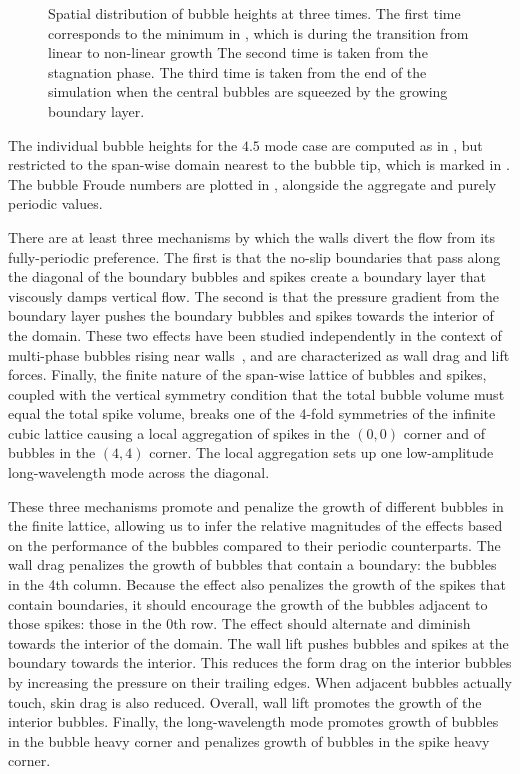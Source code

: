 \begin{figure}
\begin{subfigure}[b]{0.66\columnwidth}
\end{subfigure}
\caption{ 
Spatial distribution of bubble heights at three times.
The first time corresponds to the minimum in , which is during the transition from linear to non-linear growth
The second time is taken from the stagnation phase.
The third time is taken from the end of the simulation when the central bubbles are squeezed by the growing boundary layer.
}
\end{figure}

The individual bubble heights for the $4.5$ mode case are computed as in , but restricted to the span-wise domain nearest to the bubble tip, which is marked in .
The bubble Froude numbers are plotted in , alongside the aggregate and purely periodic values.

There are at least three mechanisms by which the walls divert the flow from its fully-periodic preference.
The first is that the no-slip boundaries that pass along the diagonal of the boundary bubbles and spikes create a boundary layer that viscously damps vertical flow.
The second is that the pressure gradient from the boundary layer pushes the boundary bubbles and spikes towards the interior of the domain.
These two effects have been studied independently in the context of multi-phase bubbles rising near walls~\cite{Takemura2002}, and are characterized as wall drag and lift forces.
Finally, the finite nature of the span-wise lattice of bubbles and spikes, coupled with the vertical symmetry condition that the total bubble volume must equal the total spike volume, breaks one of the 4-fold symmetries of the infinite cubic lattice causing a local aggregation of spikes in the $(0,0)$ corner and of bubbles in the $(4,4)$ corner.
The local aggregation sets up one low-amplitude long-wavelength mode across the diagonal.

These three mechanisms promote and penalize the growth of different bubbles in the finite lattice, allowing us to infer the relative magnitudes of the effects based on the performance of the bubbles compared to their periodic counterparts.
The wall drag penalizes the growth of bubbles that contain a boundary: the bubbles in the 4th column.
Because the effect also penalizes the growth of the spikes that contain boundaries, it should encourage the growth of the bubbles adjacent to those spikes: those in the 0th row.
The effect should alternate and diminish towards the interior of the domain.
The wall lift pushes bubbles and spikes at the boundary towards the interior.
This reduces the form drag on the interior bubbles by increasing the pressure on their trailing edges.
When adjacent bubbles actually touch, skin drag is also reduced.
Overall, wall lift promotes the growth of the interior bubbles.
Finally, the long-wavelength mode promotes growth of bubbles in the bubble heavy corner and penalizes growth of bubbles in the spike heavy corner.

